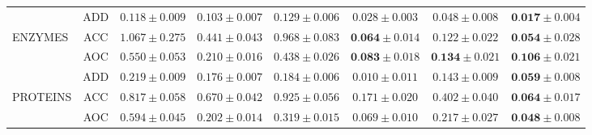 \begin{table}
\begin{tabular}{lccccccc}
         \midrule
          & ADD           & $0.118 \pm 0.009$ & $0.103 \pm 0.007$ & $0.129 \pm 0.006$ & $0.028 \pm 0.003$ & $0.048 \pm 0.008$          & $\textbf{0.017} \pm 0.004$\\
          ENZYMES & ACC   & $1.067 \pm 0.275$ & $0.441 \pm 0.043$ & $0.968 \pm 0.083$ & $\textbf{0.064} \pm 0.014$ & $0.122 \pm 0.022$          & $\textbf{0.054} \pm 0.028$\\
          & AOC           & $0.550 \pm 0.053$ & $0.210 \pm 0.016$ & $0.438 \pm 0.026$ & $\textbf{0.083} \pm 0.018$ & $\textbf{0.134} \pm 0.021$ & $\textbf{0.106} \pm 0.021$\\
         \midrule
          & ADD           & $0.219 \pm 0.009$ & $0.176 \pm 0.007$ & $0.184 \pm 0.006$ & $0.010 \pm 0.011$ & $0.143 \pm 0.009$          & $\textbf{0.059} \pm 0.008$\\
          PROTEINS & ACC  & $0.817 \pm 0.058$ & $0.670 \pm 0.042$ & $0.925 \pm 0.056$ & $0.171 \pm 0.020$ & $0.402 \pm 0.040$          & $\textbf{0.064} \pm 0.017$\\
          & AOC           & $0.594 \pm 0.045$ & $0.202 \pm 0.014$ & $0.319 \pm 0.015$ & $0.069 \pm 0.010$ & $0.217 \pm 0.027$          & $\textbf{0.048} \pm 0.008$\\
         \bottomrule
    \end{tabular}
\end{table}